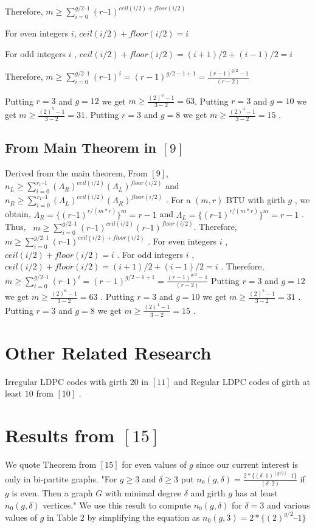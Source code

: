 \documentclass{llncs}
\begin{document}
Therefore,  $m\ge \sum _{i=0}^{g/2\text{--}1}(r\text{--}1)^{\mathit{ceil}(i/2)+\mathit{floor}(i/2)}$ 

For even integers  $i$,  $\mathit{ceil}(i/2)+\mathit{floor}(i/2)=i$

For odd integers  $i$ ,  $\mathit{ceil}(i/2)+\mathit{floor}(i/2)=(i+1)/2+(i-1)/2=i$ 

Therefore,  $m\ge \sum _{i=0}^{g/2\text{--}1}(r\text{--}1)^{i}=(r-1)^{g/2-1+1}=\frac{(r-1)^{g/2}-1}{(r-2)}$ 

Putting  $r=3$ and  $g=12$ we get  $m\ge \frac{(2)^{6}-1}{3-2}=63$. 
Putting  $r=3$  and  $g=10$ we get  $m\ge \frac{(2)^{5}-1}{3-2}=31$. 
Putting  $r=3$  and  $g=8$ we get  $m\ge \frac{(2)^{4}-1}{3-2}=15$ .

\subsection {From Main Theorem in $[9]$}
Derived from the main theorem, 
From  $[9]$, \  $n_{L}\ge \sum _{i=0}^{r_{1}\text{--}1}(\Lambda _{R})^{\mathit{ceil}(i/2)}(\Lambda _{L})^{\mathit{floor}(i/2)}$ and  $n_{R}\ge \sum _{i=0}^{r_{1}\text{--}1}(\Lambda _{L})^{\mathit{ceil}(i/2)}(\Lambda _{R})^{\mathit{floor}(i/2)}$ .
For a $(m,r)$  BTU with girth  $g$ , we obtain, $\Lambda _{R}=\{(r\text{--}1)^{r/(m\ast r)}\}^{m}=r-1$ and  $\Lambda _{L}=\{(r\text{--}1)^{r/(m\ast r)}\}^{m}=r-1$ .
Thus, \  $m\ge \sum _{i=0}^{g/2\text{--}1}(r\text{--}1)^{\mathit{ceil}(i/2)}(r\text{--}1)^{\mathit{floor}(i/2)}$.
Therefore,  $m\ge \sum _{i=0}^{g/2\text{--}1}(r\text{--}1)^{\mathit{ceil}(i/2)+\mathit{floor}(i/2)}$ .
For even integers  $i$ ,  $\mathit{ceil}(i/2)+\mathit{floor}(i/2)=i$ .
For odd integers  $i$ ,  $\mathit{ceil}(i/2)+\mathit{floor}(i/2)=(i+1)/2+(i-1)/2=i$ .
Therefore,  $m\ge \sum _{i=0}^{g/2\text{--}1}(r\text{--}1)^{i}=(r-1)^{g/2-1+1}=\frac{(r-1)^{g/2}-1}{(r-2)}$ 
Putting  $r=3$  and  $g=12$ we get  $m\ge \frac{(2)^{6}-1}{3-2}=63$ .
Putting  $r=3$  and  $g=10$ we get  $m\ge \frac{(2)^{5}-1}{3-2}=31$ .
Putting  $r=3$  and  $g=8$ we get  $m\ge \frac{(2)^{4}-1}{3-2}=15$ .

\section {Other Related Research}
Irregular LDPC codes with girth  $20$ in $[11]$ and Regular LDPC codes of girth at least $10$ from $[10]$ .

\section {Results from $[15]$}
We quote Theorem from $[15]$ for even values of $g$ since our current interest is only in bi-partite graphs. "For $g \ge 3$ and $\delta \ge 3$ put 
$n_{0}(g,\delta ) = \frac{2\ast \{(\delta \text{--}1)^{(g/2)}\text{--}1\}}{(\delta \text{--}2)}$ if  $g$ is even. Then a graph $G$ with minimal degree $\delta$ and girth $g$ has at least $n_{0}(g,\delta )$ vertices."
We use this result to compute $n_{0}(g,\delta )$ for $\delta = 3$ and various values of $g$ in Table $2$ by simplifying the equation as 
$n_{0}(g, 3 ) = {2\ast \{(2)^{g/2}\text{--}1\}}$
\end{document}
